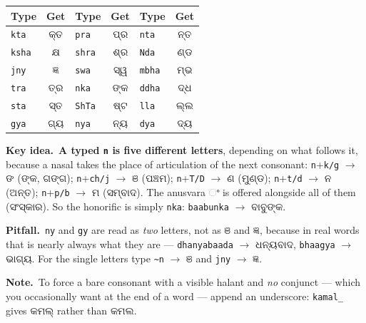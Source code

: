 \documentclass[11pt, a4paper]{article}
\newcommand{\od}[1]{{\odiafont #1}}          %
\newcommand{\odb}[1]{{\odiafont\large #1}}   %
\newcommand{\kidea}{{\color{midseagreen}\textbf{\textsf{Key idea.}}}\ }
\newcommand{\kpit}{{\color{midseaorange!85!black}\textbf{\textsf{Pitfall.}}}\ }
\newcommand{\knote}{{\color{headerblue}\textbf{\textsf{Note.}}}\ }
\begin{document}
\begin{center}
\begin{tabular}{l c l c l c}
\toprule
Type & Get & Type & Get & Type & Get \\
\midrule
\texttt{kta}  & \odb{କ୍ତ} & \texttt{pra}  & \odb{ପ୍ର} & \texttt{nta}  & \odb{ନ୍ତ} \\
\texttt{ksha} & \odb{କ୍ଷ} & \texttt{shra} & \odb{ଶ୍ର} & \texttt{Nda}  & \odb{ଣ୍ଡ} \\
\texttt{jny}  & \odb{ଜ୍ଞ} & \texttt{swa}  & \odb{ସ୍ୱ} & \texttt{mbha} & \odb{ମ୍ଭ} \\
\texttt{tra}  & \odb{ତ୍ର} & \texttt{nka}  & \odb{ଙ୍କ} & \texttt{ddha} & \odb{ଦ୍ଧ} \\
\texttt{sta}  & \odb{ସ୍ତ} & \texttt{ShTa} & \odb{ଷ୍ଟ} & \texttt{lla}  & \odb{ଲ୍ଲ} \\
\texttt{gya}  & \odb{ଗ୍ୟ} & \texttt{nya}  & \odb{ନ୍ୟ} & \texttt{dya}  & \odb{ଦ୍ୟ} \\
\bottomrule
\end{tabular}
\end{center}

\begin{keybox}
\kidea \textbf{A typed \texttt{n} is five different letters}, depending on what
follows it, because a nasal takes the place of articulation of the next consonant:
\texttt{n}+\texttt{k/g} \(\rightarrow\) \od{ଙ} (\od{ଙ୍କ}, \od{ଗଙ୍ଗ});
\texttt{n}+\texttt{ch/j} \(\rightarrow\) \od{ଞ} (\od{ପଞ୍ଚମ});
\texttt{n}+\texttt{T/D} \(\rightarrow\) \od{ଣ} (\od{ମୁଣ୍ଡ});
\texttt{n}+\texttt{t/d} \(\rightarrow\) \od{ନ} (\od{ଅନ୍ତ});
\texttt{n}+\texttt{p/b} \(\rightarrow\) \od{ମ} (\od{ସମ୍ବାଦ}).
The anusvara \od{ଂ} is offered alongside all of them (\od{ସଂସ୍କାର}).
So the honorific is simply \texttt{nka}: \texttt{baabunka} \(\rightarrow\) \od{ବାବୁଙ୍କ}.
\end{keybox}

\begin{warnbox}
\kpit \texttt{ny} and \texttt{gy} are read as \emph{two} letters, not as \od{ଞ} and
\od{ଜ୍ଞ}, because in real words that is nearly always what they are ---
\texttt{dhanyabaada} \(\rightarrow\) \od{ଧନ୍ୟବାଦ}, \texttt{bhaagya} \(\rightarrow\)
\od{ଭାଗ୍ୟ}. For the single letters type \texttt{\textasciitilde n} \(\rightarrow\) \od{ଞ}
and \texttt{jny} \(\rightarrow\) \od{ଜ୍ଞ}.
\end{warnbox}

\begin{notebox}
\knote To force a bare consonant with a visible halant and \emph{no} conjunct --- which
you occasionally want at the end of a word --- append an underscore:
\texttt{kamal\_} gives \od{କମଲ୍} rather than \od{କମଲ}.
\end{notebox}
\end{document}
